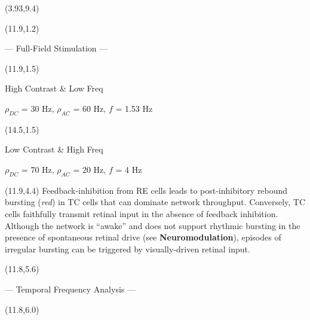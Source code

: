 \documentclass[a0]{a0poster}
\def\CHead#1{\begin{center} {\LARGE\color{DarkBlue} #1} \end{center}}
\begin{document}
\begin{textblock}{3.33}(3.93,9.4)
\begin{center}
\end{center}
\end{textblock}

\begin{textblock}{5.3}(11.9,1.2)
\CHead{--- Full-Field Stimulation --- } 
\end{textblock}

\begin{textblock}{2.6}(11.9,1.5)
\CHead{\large High Contrast \& Low Freq} 
\begin{center}

{\small $\rho_{DC}$ = 30 Hz, $\rho_{AC}$ = 60 Hz, $f$ = 1.53 Hz }
\end{center}
\end{textblock}

\begin{textblock}{2.6}(14.5,1.5)
\CHead{\large Low Contrast \& High Freq} 
\begin{center}

{\small $\rho_{DC}$ = 70 Hz, $\rho_{AC}$ = 20 Hz, $f$ = 4 Hz }
\end{center}
\end{textblock}

\begin{textblock}{5.3}(11.9,4.4)
Feedback-inhibition from RE cells leads to
post-inhibitory rebound bursting ({\it red}) in TC cells that can dominate
network throughput. Conversely, TC cells faithfully transmit retinal input in
the absence of feedback inhibition. 
Although the network is ``awake'' and does not
support rhythmic bursting in the 
presence of spontaneous retinal drive (see {\bf
Neuromodulation}), episodes of irregular
bursting can be triggered by visually-driven retinal input. 
\end{textblock}

\begin{textblock}{5.3}(11.8,5.6)
\CHead{--- Temporal Frequency Analysis --- } 
\end{textblock}

\begin{textblock}{2.65}(11.8,6.0)
\begin{center}
\end{center}
\end{textblock}
\end{document}

